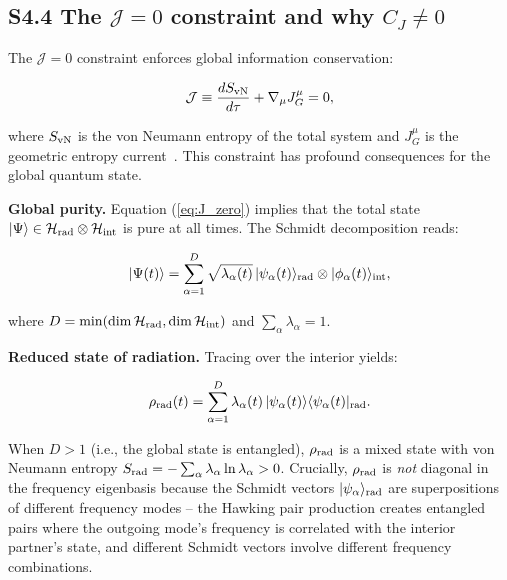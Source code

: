 \documentclass[prd,aps,showpacs,superscriptaddress,twocolumn]{revtex4-2}
\begin{document}
\subsection{S4.4 The $\mathcal{J}=0$ constraint and why $C_J \neq 0$}

The $\mathcal{J}=0$ constraint enforces global information conservation:

\begin{equation}
\mathcal{J} \equiv \frac{dS_{\rm vN}}{d\tau} + \nabla_\mu J_G^\mu = 0,
\label{eq:J_zero}
\end{equation}

where $S_{\rm vN}$ is the von Neumann entropy of the total system and $J_G^\mu$ is the geometric entropy current~\cite{Jacobson1995}. This constraint has profound consequences for the global quantum state.

\textbf{Global purity.} Equation (\ref{eq:J_zero}) implies that the total state $|\Psi\rangle \in \mathcal{H}_{\rm rad} \otimes \mathcal{H}_{\rm int}$ is pure at all times. The Schmidt decomposition reads:

\begin{equation}
|\Psi(t)\rangle = \sum_{\alpha=1}^{D} \sqrt{\lambda_\alpha(t)} \, |\psi_\alpha(t)\rangle_{\rm rad} \otimes |\phi_\alpha(t)\rangle_{\rm int},
\label{eq:Schmidt}
\end{equation}

where $D = \min(\dim\mathcal{H}_{\rm rad}, \dim\mathcal{H}_{\rm int})$ and $\sum_\alpha \lambda_\alpha = 1$.

\textbf{Reduced state of radiation.} Tracing over the interior yields:

\begin{equation}
\rho_{\rm rad}(t) = \sum_{\alpha=1}^{D} \lambda_\alpha(t) \, |\psi_\alpha(t)\rangle\langle\psi_\alpha(t)|_{\rm rad}.
\label{eq:rho_rad}
\end{equation}

When $D > 1$ (i.e., the global state is entangled), $\rho_{\rm rad}$ is a mixed state with von Neumann entropy $S_{\rm rad} = -\sum_\alpha \lambda_\alpha \ln \lambda_\alpha > 0$. Crucially, $\rho_{\rm rad}$ is \emph{not} diagonal in the frequency eigenbasis because the Schmidt vectors $|\psi_\alpha\rangle_{\rm rad}$ are superpositions of different frequency modes -- the Hawking pair production creates entangled pairs where the outgoing mode's frequency is correlated with the interior partner's state, and different Schmidt vectors involve different frequency combinations.
\end{document}
